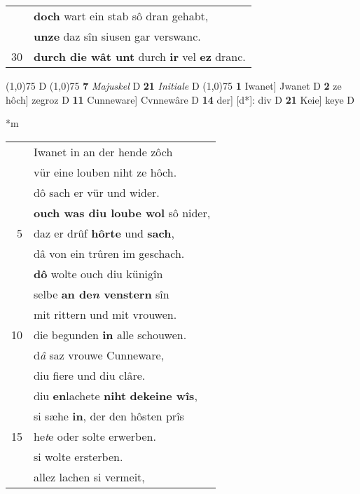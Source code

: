\documentclass[8pt,a4paper,notitlepage]{article}
\begin{document}
\begin{table}[ht]
\begin{minipage}[t]{0.5\linewidth}
\begin{tabular}{rl}
 & \textbf{doch} wart ein stab sô dran gehabt,\\ 
 & \textbf{unze} daz sîn siusen gar verswanc.\\ 
30 & \textbf{durch die wât unt} durch \textbf{ir} vel \textbf{ez} dranc.\\ 
\end{tabular}
\scriptsize
\line(1,0){75} \newline
D \newline
\line(1,0){75} \newline
\textbf{7} \textit{Majuskel} D  \textbf{21} \textit{Initiale} D  \newline
\line(1,0){75} \newline
\textbf{1} Iwanet] Jwanet D \textbf{2} ze hôch] zegroz D \textbf{11} Cunneware] Cvnnewâre D \textbf{14} der] [d*]: div D \textbf{21} Keie] keye D \newline
\end{minipage}
\hspace{0.5cm}
\begin{minipage}[t]{0.5\linewidth}
\small
\begin{center}*m
\end{center}
\begin{tabular}{rl}
 & Iwanet in an der hende zôch\\ 
 & vür eine louben niht ze hôch.\\ 
 & dô sach er vür und wider.\\ 
 & \textbf{ouch was diu loube wol} sô nider,\\ 
5 & daz er drûf \textbf{hôrte} und \textbf{sach},\\ 
 & dâ von ein trûren im geschach.\\ 
 & \textbf{dô} wolte ouch diu künigîn\\ 
 & selbe \textbf{an de\textit{n} venstern} sîn\\ 
 & mit rittern und mit vrouwen.\\ 
10 & die begunden \textbf{in} alle schouwen.\\ 
 & d\textit{â} saz vrouwe Cunneware,\\ 
 & diu fiere und diu clâre.\\ 
 & diu \textbf{en}lachete \textbf{niht} \textbf{dekeine wîs},\\ 
 & si sæhe \textbf{in}, der den hôsten prîs\\ 
15 & he\textit{t}e oder solte erwerben.\\ 
 & si wolte ersterben.\\ 
 & allez lachen si vermeit,\\ 

\end{tabular}
\end{minipage}
\end{table}
\end{document}
